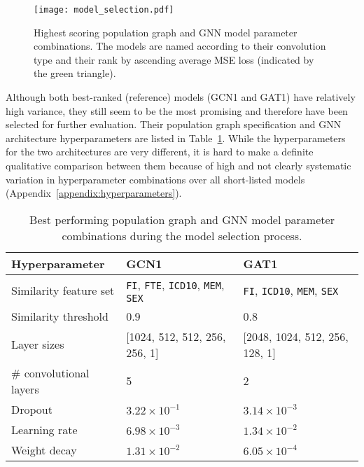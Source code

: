 

\begin{figure}[h]
    \centering
    \texttt{[image: model\_selection.pdf]}
    \caption{Highest scoring population graph and GNN model parameter combinations. The models are named according to their convolution type and their rank by ascending average MSE loss (indicated by the green triangle).}\label{figure:gat-gcn-rank}
\end{figure}

Although both best-ranked (reference) models (GCN1 and GAT1) have relatively high variance, they still seem to be the most promising and therefore have been selected for further evaluation. Their population graph specification and GNN architecture hyperparameters are listed in Table~\ref{table:best-hyperparameters}. While the hyperparameters for the two architectures are very different, it is hard to make a definite qualitative comparison between them because of high and not clearly systematic variation in hyperparameter combinations over all short-listed models (Appendix~\ref{appendix:hyperparameters}).

\begin{table}[]
    \caption{Best performing population graph and GNN model parameter combinations during the model selection process.}\label{table:best-hyperparameters}
    \centering
    \small
    \begin{tabular}{p{}p{}p{}}
        \hline
    \textbf{Hyperparameter} & \textbf{GCN1} & \textbf{GAT1} \\  \hline
        Similarity feature set & \texttt{FI}, \texttt{FTE}, \texttt{ICD10}, \texttt{MEM}, \texttt{SEX} & \texttt{FI}, \texttt{ICD10}, \texttt{MEM}, \texttt{SEX} \\
        Similarity threshold & 0.9 & 0.8 \\ \hline
        Layer sizes & [1024, 512, 512, 256, 256, 1] & [2048, 1024, 512, 256, 128, 1] \\
        \# convolutional layers & 5 & 2 \\
        Dropout & $3.22 \times 10^{-1}$ & $3.14 \times 10^{-3}$ \\
        Learning rate & $6.98 \times 10^{-3}$ & $1.34 \times 10^{-2}$ \\
        Weight decay & $1.31 \times 10^{-2}$ & $6.05 \times 10^{-4}$ \\ \hline
\end{tabular}
\end{table}

